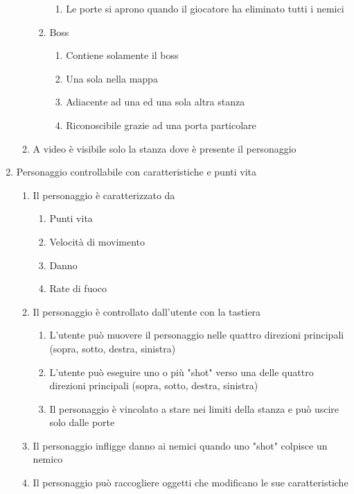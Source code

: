 \begin{enumerate}
\begin{enumerate}
\begin{enumerate}
\begin{enumerate}
                        \item Le porte si aprono quando il giocatore ha eliminato tutti i nemici
                    \end{enumerate}
                \item Boss
                    \begin{enumerate}
                        \item Contiene solamente il boss
                        \item Una sola nella mappa
                        \item Adiacente ad una ed una sola altra stanza
                        \item Riconoscibile grazie ad una porta particolare 
                    \end{enumerate}
            \end{enumerate}
        \item A video è visibile solo la stanza dove è presente il personaggio
        
    \end{enumerate}
    
    \item Personaggio controllabile con caratteristiche e punti vita
    \begin{enumerate}
        \item Il personaggio è caratterizzato da
            \begin{enumerate}
                \item Punti vita
                \item Velocità di movimento
                \item Danno
                \item Rate di fuoco
            \end{enumerate}
        \item Il personaggio è controllato dall'utente con la tastiera
        \begin{enumerate}
            \item L'utente può muovere il personaggio nelle quattro direzioni principali (sopra, sotto, destra, sinistra)
            \item L'utente può eseguire uno o più "shot" verso una delle quattro direzioni principali (sopra, sotto, destra, sinistra)
            \item Il personaggio è vincolato a stare nei limiti della stanza e può uscire solo dalle porte
        \end{enumerate}
        \item Il personaggio infligge danno ai nemici quando uno "shot" colpisce un nemico
        \item Il personaggio può raccogliere oggetti che modificano le sue caratteristiche
    \end{enumerate}
    

\end{enumerate}
